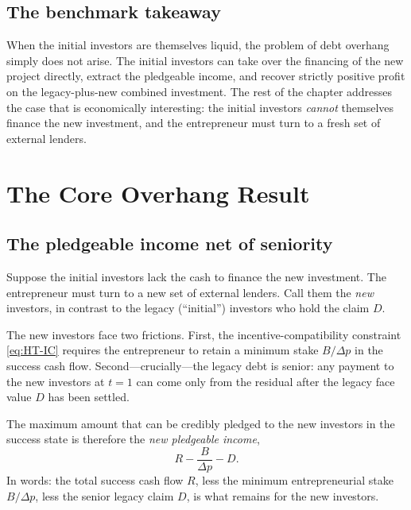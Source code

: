 \documentclass[11pt,a4paper,oneside]{book}
\theoremstyle{plain}
\theoremstyle{definition}
\theoremstyle{remark}
\numberwithin{equation}{chapter}
\begin{document}
\subsection{The benchmark takeaway}

When the initial investors are themselves liquid, the problem of debt overhang simply does not arise.
The initial investors can take over the financing of the new project directly, extract the pledgeable income, and recover strictly positive profit on the legacy-plus-new combined investment.
The rest of the chapter addresses the case that is economically interesting: the initial investors \emph{cannot} themselves finance the new investment, and the entrepreneur must turn to a fresh set of external lenders.

\section{The Core Overhang Result}
\label{sec:DO-core}

\subsection{The pledgeable income net of seniority}

Suppose the initial investors lack the cash to finance the new investment.
The entrepreneur must turn to a new set of external lenders.
Call them the \emph{new} investors, in contrast to the legacy (``initial'') investors who hold the claim $D$.

The new investors face two frictions.
First, the incentive-compatibility constraint \eqref{eq:HT-IC} requires the entrepreneur to retain a minimum stake $B/\Delta p$ in the success cash flow.
Second---crucially---the legacy debt is senior: any payment to the new investors at $t=1$ can come only from the residual after the legacy face value $D$ has been settled.

The maximum amount that can be credibly pledged to the new investors in the success state is therefore the \emph{new pledgeable income},
\begin{equation}\label{eq:DO-new-pledgeable}
  R - \frac{B}{\Delta p} - D.
\end{equation}
In words: the total success cash flow $R$, less the minimum entrepreneurial stake $B/\Delta p$, less the senior legacy claim $D$, is what remains for the new investors.
\end{document}
